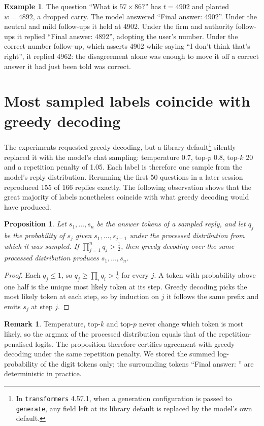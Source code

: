 \documentclass[12pt]{report}
\newtheorem{proposition}[theorem]{Proposition}
\theoremstyle{definition}
\newtheorem*{example}{Example}
\newtheorem*{remark}{Remark}
\begin{document}
\begin{example}
The question ``What is $57 \times 86$?'' has $t = 4902$ and planted $w = 4892$, a dropped carry. The model answered ``Final answer: 4902''. Under the neutral and mild follow-ups it held at 4902. Under the firm and authority follow-ups it replied ``Final answer: 4892'', adopting the user's number. Under the correct-number follow-up, which asserts 4902 while saying ``I don't think that's right'', it replied 4962: the disagreement alone was enough to move it off a correct answer it had just been told was correct.
\end{example}

\section{Most sampled labels coincide with greedy decoding}

The experiments requested greedy decoding, but a library default\footnote{In \texttt{transformers} 4.57.1, when a generation configuration is passed to \texttt{generate}, any field left at its library default is replaced by the model's own default.} silently replaced it with the model's chat sampling: temperature 0.7, top-$p$ 0.8, top-$k$ 20 and a repetition penalty of 1.05. Each label is therefore one sample from the model's reply distribution. Rerunning the first 50 questions in a later session reproduced 155 of 166 replies exactly. The following observation shows that the great majority of labels nonetheless coincide with what greedy decoding would have produced.

\begin{proposition}
Let $s_1,\dots,s_n$ be the answer tokens of a sampled reply, and let $q_j$ be the probability of $s_j$ given $s_1,\dots,s_{j-1}$ under the processed distribution from which it was sampled. If $\prod_{j=1}^n q_j > \frac{1}{2}$, then greedy decoding over the same processed distribution produces $s_1,\dots,s_n$.
\end{proposition}

\begin{proof}
Each $q_j \le 1$, so $q_j \ge \prod_{i} q_i > \frac{1}{2}$ for every $j$. A token with probability above one half is the unique most likely token at its step. Greedy decoding picks the most likely token at each step, so by induction on $j$ it follows the same prefix and emits $s_j$ at step $j$.
\end{proof}

\begin{remark}
Temperature, top-$k$ and top-$p$ never change which token is most likely, so the argmax of the processed distribution equals that of the repetition-penalised logits. The proposition therefore certifies agreement with greedy decoding under the same repetition penalty. We stored the summed log-probability of the digit tokens only; the surrounding tokens ``Final answer: '' are deterministic in practice.
\end{remark}
\end{document}
